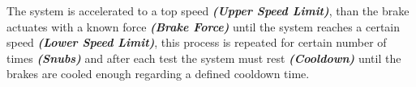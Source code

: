 			The system is accelerated to a top speed \textit{\textbf{(Upper Speed Limit)}}, than the brake actuates with a known force \textit{\textbf{(Brake Force)}} until the system reaches a certain speed \textit{\textbf{(Lower Speed Limit)}}, this process is repeated for certain number of times \textit{\textbf{(Snubs)}} and after each test the system must rest \textit{\textbf{(Cooldown)}} until the brakes are cooled enough regarding a defined cooldown time.